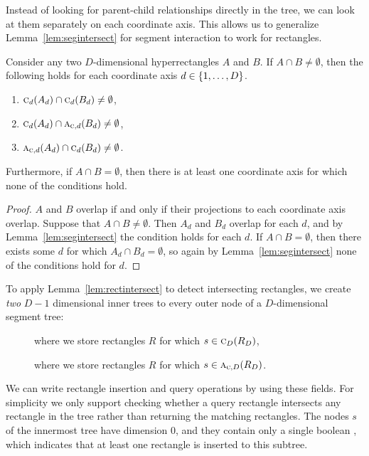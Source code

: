 \documentclass[english,gradu]{tktltiki2018}
\begin{document}
Instead of looking for parent-child relationships directly in the tree, we can look at them separately on each coordinate axis.
This allows us to generalize Lemma~\ref{lem:segintersect} for segment interaction to work for rectangles.

\begin{lem}\label{lem:rectintersect}Consider any two $D$-dimensional hyperrectangles $A$ and $B$.
If $A\cap B\neq\emptyset$, then the following holds for each coordinate axis $d\in\set{1,\dots,D}$.
\begin{enumerate}
\item $\canoni{A_d}{d}\cap\canoni{B_d}{d}\neq\emptyset$,
\item $\canoni{A_d}{d}\cap\canonpari{B_d}{d}\neq\emptyset$,
\item $\canonpari{A_d}{d}\cap\canoni{B_d}{d}\neq\emptyset$.
\end{enumerate}
Furthermore, if $A\cap B=\emptyset$, then there is at least one coordinate axis for which none of the conditions hold.
\end{lem}
\begin{proof}
$A$ and $B$ overlap if and only if their projections to each coordinate axis overlap.
Suppose that $A\cap B\neq\emptyset$.
Then $A_d$ and $B_d$ overlap for each $d$, and by Lemma~\ref{lem:segintersect} the condition holds for each $d$.
If $A\cap B=\emptyset$, then there exists some $d$ for which $A_d\cap B_d=\emptyset$, so again by Lemma~\ref{lem:segintersect} none of the conditions hold for $d$.
\end{proof}

To apply Lemma~\ref{lem:rectintersect} to detect intersecting rectangles, we create \emph{two} $D-1$ dimensional inner trees to every outer node of a $D$-dimensional segment tree:
\begin{description}
\item[] where we store rectangles $R$ for which $s\in\canoni{R_D}{D}$,
\item[] where we store rectangles $R$ for which $s\in\canonpari{R_D}{D}$.
\end{description}

We can write rectangle insertion and query operations by using these fields.
For simplicity we only support checking whether a query rectangle intersects any rectangle in the tree rather than returning the matching rectangles.
The nodes $s$ of the innermost tree have dimension 0, and they contain only a single boolean , which indicates that at least one rectangle is inserted to this subtree.
\end{document}
